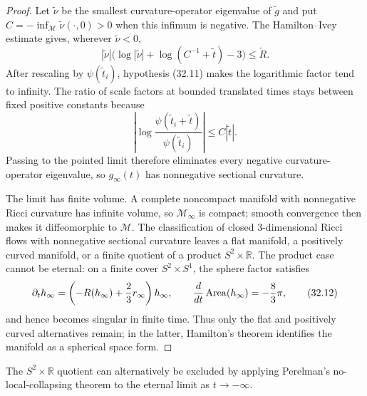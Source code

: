 \begin{proof}
Let $\widetilde\nu$ be the smallest curvature-operator eigenvalue of
$\widetilde g$ and put
$C=-\inf_{\mathcal M}\widetilde\nu(\cdot,0)>0$ when this infimum is
negative.  The Hamilton--Ivey estimate gives, wherever
$\widetilde\nu<0$,
\[
 |\widetilde\nu|
 \bigl(\log|\widetilde\nu|+\log(C^{-1}+\widetilde t)-3\bigr)
 \le\widetilde R.
\]
After rescaling by $\psi(\widetilde t_i)$, hypothesis (32.11) makes the
logarithmic factor tend to infinity.  The ratio of scale factors at bounded
translated times stays between fixed positive constants because
\[
 \left|\log\frac{\psi(\widetilde t_i+\widetilde t)}
 {\psi(\widetilde t_i)}\right|
 \le C|\widetilde t|.
\]
Passing to the pointed limit therefore eliminates every negative
curvature-operator eigenvalue, so $g_\infty(t)$ has nonnegative sectional
curvature.

The limit has finite volume.  A complete noncompact manifold with
nonnegative Ricci curvature has infinite volume, so $\mathcal M_\infty$ is
compact; smooth convergence then makes it diffeomorphic to $\mathcal M$.
The classification of closed $3$-dimensional Ricci flows with nonnegative
sectional curvature leaves a flat manifold, a positively curved manifold,
or a finite quotient of a product $S^2\times\mathbb R$.  The product case
cannot be eternal: on a finite cover $S^2\times S^1$, the sphere factor
satisfies
\[
 \partial_th_\infty
 =\left(-R(h_\infty)+\frac23r_\infty\right)h_\infty,
 \qquad
 \frac d{dt}\operatorname{Area}(h_\infty)=-\frac83\pi,
 \tag{32.12}
\]
and hence becomes singular in finite time.  Thus only the flat and
positively curved alternatives remain; in the latter, Hamilton's theorem
identifies the manifold as a spherical space form.
\end{proof}

\begin{remark}
\label{rem:chow-iv-exclude-sphere-line-product}
The $S^2\times\mathbb R$ quotient can alternatively be excluded by applying
Perelman's no-local-collapsing theorem to the eternal limit as
$t\to-\infty$.
\end{remark}

